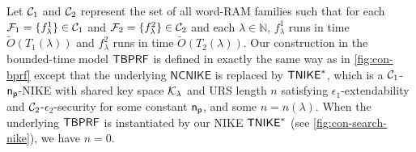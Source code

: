 Let $\mathcal{C}_1$ and $\mathcal{C}_2$ represent the set of all word-RAM families such that for each $\mathcal{F}_1 = \{f_{\lambda}^1\} \in \mathcal{C}_1$ and $\mathcal{F}_2 = \{f_{\lambda}^2\} \in \mathcal{C}_2$ and each $\lambda \in \mathbb{N}$, $f_{\lambda}^1$ runs in time $\tilde{O}(T_1(\lambda))$ and $f_{\lambda}^2$ runs in time $\tilde{O}(T_2(\lambda))$.
Our construction in the bounded-time model $\mathsf{TBPRF}$ is defined in exactly the same way as in \cref{fig:con-bprf} except that the underlying $\mathsf{NCNIKE}$ is replaced by $\mathsf{TNIKE}^*$, which is a $\mathcal{C}_1$-$\mathsf{n_p}$-NIKE with shared key space $\mathcal{K}_{\lambda}$ and URS length $n$ satisfying $\epsilon_1$-extendability and $\mathcal{C}_2$-$\epsilon_2$-security for some constant $\mathsf{n_p}$, and some $n = n(\lambda)$. When the underlying $\mathsf{TBPRF}$ is instantiated by our NIKE $\mathsf{TNIKE}^*$ (see \cref{fig:con-search-nike}), we have $n=0$.

